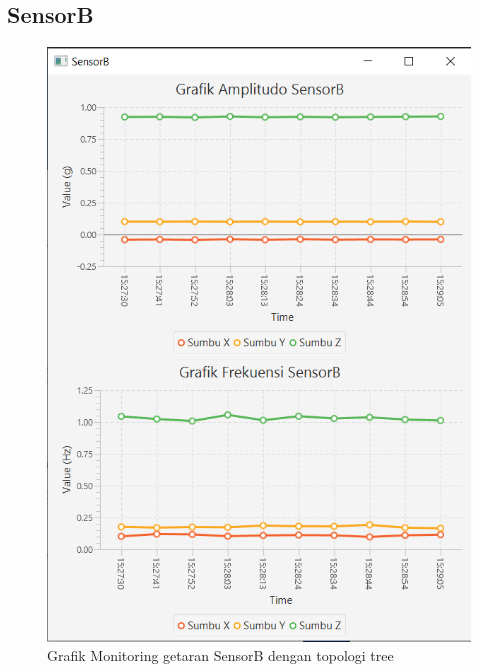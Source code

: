 \subsection{SensorB}
\begin{figure}[H] 
	\centering  
	\includegraphics[scale=1]{Lampiran/HasilPengujian/sensorB_treeRooftop.PNG} 
	\caption[Grafik Monitoring getaran SensorB dengan topologi tree]{Grafik Monitoring getaran SensorB dengan topologi tree}
	\label{fig:grafik_B_tree_rooftop} 
\end{figure}

